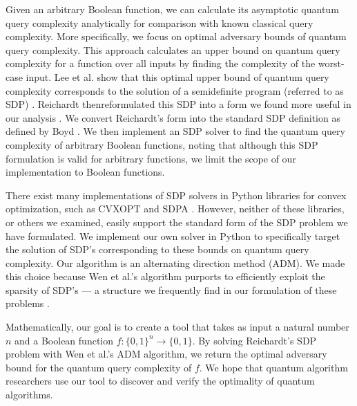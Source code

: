 Given an arbitrary Boolean function, we can calculate its
asymptotic quantum query complexity analytically for
comparison with known classical query complexity. More
specifically, we focus on optimal adversary bounds of
quantum query complexity. This approach calculates an upper
bound on quantum query complexity for a function over all
inputs by finding the complexity of the worst-case input.
Lee et al. show that this optimal upper bound of quantum
query complexity corresponds to the solution of a
semidefinite program (referred to as SDP)
\cite{lee2011quantum}. Reichardt thenreformulated this SDP
into a form we found more useful in our analysis
\cite{reichardt2009span}. We convert Reichardt's
form into the standard SDP definition as defined by Boyd
\cite{boyd2004convex}. We then implement an SDP
solver to find the quantum query complexity of arbitrary
Boolean functions, noting that although this SDP
formulation is valid for arbitrary functions, we limit the
scope of our implementation to Boolean functions.

There exist many implementations of SDP solvers in Python
libraries for convex optimization, such as CVXOPT and SDPA
\cite{cvxopt, SDPA}. However, neither of these libraries,
or others we examined, easily support the standard form of
the SDP problem we have formulated. We implement our own
solver in Python to specifically target the solution of
SDP's corresponding to these bounds on quantum query
complexity. Our algorithm is an alternating
direction method (ADM). We made this choice because Wen et
al.'s algorithm purports to efficiently exploit the
sparsity of SDP's --- a structure we frequently find in our
formulation of these problems \cite{adm}.

Mathematically, our goal is to create a tool that takes as
input a natural number $n$ and a Boolean function 
$f: \{0,1\}^n \rightarrow \{0,1\}$. 
By solving Reichardt's SDP problem with
Wen et al.'s ADM algorithm, we return the optimal adversary bound for the quantum query complexity of $f$. We hope that quantum algorithm researchers use our tool to discover and verify the optimality of quantum algorithms.